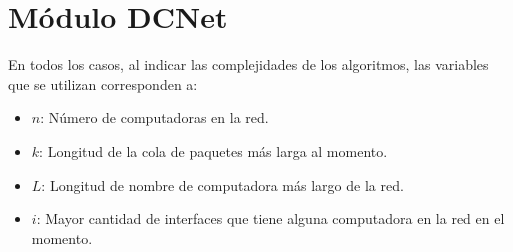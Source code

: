 \section{M\'{o}dulo DCNet}

  En todos los casos, al indicar las complejidades de los algoritmos, las variables que se utilizan corresponden a:
  \vspace{-0.5em}\begin{itemize}
    \item $n$: N\'umero de computadoras en la red.
    \item $k$: Longitud de la cola de paquetes m\'as larga al momento.
    \item $L$: Longitud de nombre de computadora m\'as largo de la red.
    \item $i$: Mayor cantidad de interfaces que tiene alguna computadora en la red en el momento.
  \end{itemize}


